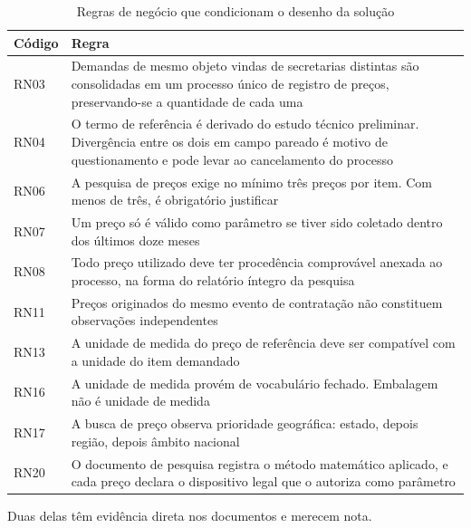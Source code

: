 \begin{table}[H]
  \centering
  \caption{Regras de negócio que condicionam o desenho da solução}
  \label{tab:regras-de-negocio}
  \begin{ufopaespacosimples}
  \small
  \begin{tabularx}{\textwidth}{@{}lX@{}}
    \toprule
    \textbf{Código} & \textbf{Regra} \\
    \midrule
    RN03 & Demandas de mesmo objeto vindas de secretarias distintas são
      consolidadas em um processo único de registro de preços, preservando-se a
      quantidade de cada uma \\
    RN04 & O termo de referência é derivado do estudo técnico preliminar.
      Divergência entre os dois em campo pareado é motivo de questionamento e
      pode levar ao cancelamento do processo \\
    RN06 & A pesquisa de preços exige no mínimo três preços por item. Com menos
      de três, é obrigatório justificar \\
    RN07 & Um preço só é válido como parâmetro se tiver sido coletado dentro dos
      últimos doze meses \\
    RN08 & Todo preço utilizado deve ter procedência comprovável anexada ao
      processo, na forma do relatório íntegro da pesquisa \\
    RN11 & Preços originados do mesmo evento de contratação não constituem
      observações independentes \\
    RN13 & A unidade de medida do preço de referência deve ser compatível com a
      unidade do item demandado \\
    RN16 & A unidade de medida provém de vocabulário fechado. Embalagem não é
      unidade de medida \\
    RN17 & A busca de preço observa prioridade geográfica: estado, depois
      região, depois âmbito nacional \\
    RN20 & O documento de pesquisa registra o método matemático aplicado, e cada
      preço declara o dispositivo legal que o autoriza como parâmetro \\
    \bottomrule
  \end{tabularx}
  \end{ufopaespacosimples}
\end{table}

Duas delas têm evidência direta nos documentos e merecem nota.

